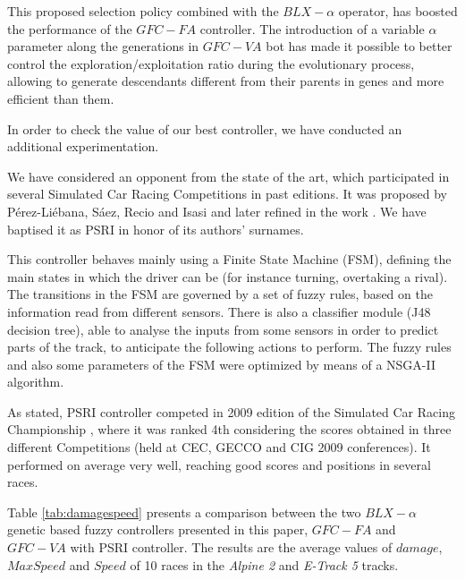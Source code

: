 \documentclass[conference]{IEEEtran}
\begin{document}
This proposed selection policy combined with the $BLX-\alpha$ operator, has boosted the performance of the $GFC-FA$ controller. 
The introduction of a variable $\alpha$ parameter along the
generations in $GFC-VA$ bot has made it possible to better control the
exploration/exploitation ratio during the evolutionary process,
allowing to generate descendants different from their parents in genes
and more efficient than them. 



In order to check the value of our best controller, we have conducted an additional experimentation.

We have considered an opponent from the state of the art, which participated in several Simulated Car Racing Competitions in past editions. 
It was proposed by P{\'e}rez-Li{\'e}bana, S{\'a}ez, Recio and Isasi \cite{EvolvingRuleSystem08} and later refined in the work \cite{PerezEvolvingFuzzy09}. We have baptised it as PSRI in honor of its authors' surnames.

This controller behaves mainly using a Finite State Machine (FSM), defining the main states in which the driver can be (for instance turning, overtaking a rival). The transitions in the FSM are governed by a set of fuzzy rules, based on the information read from different sensors. There is also a classifier module (J48 decision tree), able to analyse the inputs from some sensors in order to predict parts of the track, to anticipate the following actions to perform. The fuzzy rules and also some parameters of the FSM were optimized by means of a NSGA-II algorithm.

As stated, PSRI controller competed in 2009 edition of the Simulated Car Racing Championship \cite{SimulatedCarRacing-2010}, where it was ranked 4th considering the scores obtained in three different Competitions (held at CEC, GECCO and CIG 2009 conferences). It performed on average very well, reaching good scores and positions in several races.

Table \ref{tab:damagespeed} presents a comparison between the two $BLX-\alpha$ genetic based fuzzy controllers presented in this paper, \textbf{$GFC-FA$} and \textbf{$GFC-VA$} with PSRI controller. The results are the average values of $damage$, $MaxSpeed$ and $Speed$ of 10 races in the \textit{Alpine 2} and \textit{E-Track 5} tracks. 
\end{document}
